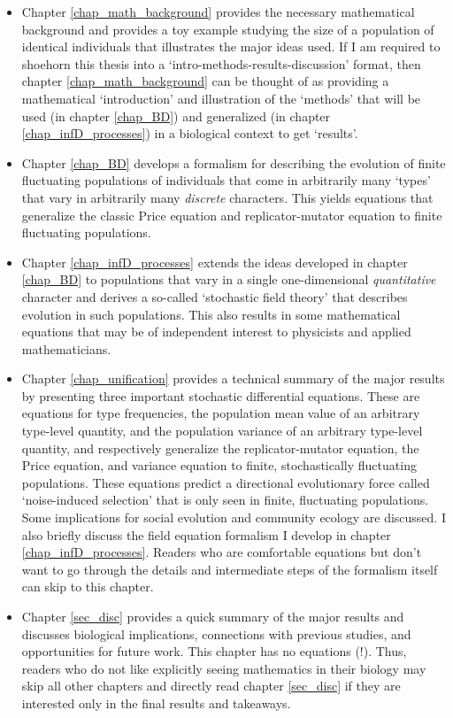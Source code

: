 \begin{itemize}
		\item Chapter \ref{chap_math_background} provides the necessary mathematical background and provides a toy example studying the size of a population of identical individuals that illustrates the major ideas used. If I am required to shoehorn this thesis into a `intro-methods-results-discussion' format, then chapter \ref{chap_math_background} can be thought of as providing a mathematical `introduction' and illustration of the `methods' that will be used (in chapter \ref{chap_BD}) and generalized (in chapter \ref{chap_infD_processes}) in a biological context to get `results'.
		\item Chapter \ref{chap_BD} develops a formalism for describing the evolution of finite fluctuating populations of individuals that come in arbitrarily many `types' that vary in arbitrarily many \emph{discrete} characters. This yields equations that generalize the classic Price equation and replicator-mutator equation to finite fluctuating populations.
		\item Chapter \ref{chap_infD_processes} extends the ideas developed in chapter \ref{chap_BD} to populations that vary in a single one-dimensional \emph{quantitative} character and derives a so-called `stochastic field theory' that describes evolution in such populations. This also results in some mathematical equations that may be of independent interest to physicists and applied mathematicians.
		\item Chapter \ref{chap_unification} provides a technical summary of the major results by presenting three important stochastic differential equations. These are equations for type frequencies, the population mean value of an arbitrary type-level quantity, and the population variance of an arbitrary type-level quantity, and respectively generalize the replicator-mutator equation, the Price equation, and  variance equation to finite, stochastically fluctuating populations. These equations predict a directional evolutionary force called `noise-induced selection' that is only seen in finite, fluctuating populations. Some implications for social evolution and community ecology are discussed. I also briefly discuss the field equation formalism I develop in chapter \ref{chap_infD_processes}. Readers who are comfortable equations but don't want to go through the details and intermediate steps of the formalism itself can skip to this chapter.
		\item Chapter \ref{sec_disc} provides a quick summary of the major results and discusses biological implications, connections with previous studies, and opportunities for future work. This chapter has no equations (!). Thus, readers who do not like explicitly seeing mathematics in their biology may skip all other chapters and directly read chapter \ref{sec_disc} if they are interested only in the final results and takeaways. 
\end{itemize}
